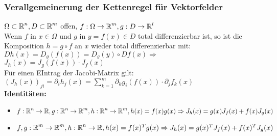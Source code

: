\documentclass[german]{latex4ei/latex4ei_sheet}
\begin{document}
\subsubsection{Verallgemeinerung der Kettenregel f\"ur Vektorfelder}
$\Omega \subset \operatorname{\mathbb R}^n, D \subset \operatorname{\mathbb R}^m$ offen, $f: \Omega \rightarrow \operatorname{\mathbb R}^m, g: D \rightarrow \operatorname{\mathbb R}^l$\\
Wenn $f$ in $x \in \Omega$ und $g$ in $y=f(x)\in D$ total differenzierbar ist, so ist die Komposition $h=g \circ f$ an $x$ wieder total differenzierbar mit:\\
$Dh(x)=D_g(f(x))=D_g(y) \circ Df(x) \Rightarrow$\\
$J_h(x)=J_g(f(x))\cdot J_f(x)$\\
F\"ur einen EIntrag der Jacobi-Matrix gilt:\\
$(J_h(x))_{ji}=\partial_i h_j(x)=\sum_{k=1}^{m} \partial_k g_i(f(x))\cdot \partial_j f_k(x)$\\
\textbf{Identit\"aten:}
\begin{itemize}
\item $f:\operatorname{\mathbb R}^n \rightarrow \operatorname{\mathbb R}, g:\operatorname{\mathbb R}^n \rightarrow \operatorname{\mathbb R}^m,h: \operatorname{\mathbb R}^n \rightarrow \operatorname{\mathbb R}^m, h(x) = f(x) g(x) \Rightarrow J_h(x) = g(x) J_f(x) + f(x) J_g(x)$
\item $f, g : \operatorname{\mathbb R}^m \to \operatorname{\mathbb R}^m,h : \operatorname{\mathbb R}^n \rightarrow \operatorname{\mathbb R}, h(x) = f(x)^T g(x) \Rightarrow J_h(x) = g(x)^T J_f (x) + f(x)^T J_g(x)$
\end{itemize}
\end{document}
